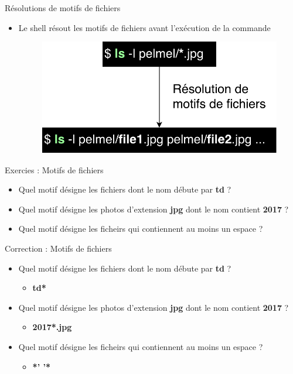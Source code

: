 \documentclass[xcolor=table]{beamer}
\begin{document}
\begin{frame}{Résolutions de motifs de fichiers}
\begin{itemize}
    \item Le shell résout les motifs de fichiers avant l'exécution de la commande
    \begin{figure}
    \includegraphics[scale=0.5]{fig/file-pattern.pdf}
    \end{figure}
\end{itemize}
\end{frame}

\begin{frame}{Exercies : Motifs de fichiers}
\begin{itemize}
    \item Quel motif désigne les fichiers dont le nom débute par \textbf{td} ?
    \item Quel motif désigne les photos d'extension \textbf{jpg} dont le nom contient \textbf{2017} ?
    \item Quel motif désigne les ficheirs qui contiennent au moins un espace ?
\end{itemize}
\end{frame}

\begin{frame}{Correction : Motifs de fichiers}
\begin{itemize}
    \item Quel motif désigne les fichiers dont le nom débute par \textbf{td} ?
    \begin{itemize}
        \item \textbf{td*}
    \end{itemize}
    \item Quel motif désigne les photos d'extension \textbf{jpg} dont le nom contient \textbf{2017} ?
    \begin{itemize}
        \item \textbf{2017*.jpg}
    \end{itemize}
    \item Quel motif désigne les ficheirs qui contiennent au moins un espace ?
    \begin{itemize}
        \item \textbf{*' '*}
    \end{itemize}
\end{itemize}
\end{frame}
\end{document}
